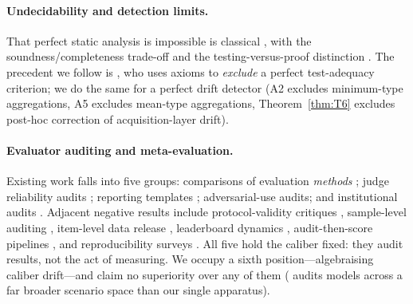\documentclass{article}
\begin{document}
\paragraph{Undecidability and detection limits.} That perfect static analysis is impossible is classical
\citep{turing1936computable,rice1953classes,landi1992undecidability,ramalingam1994undecidability}, with the
soundness/completeness trade-off \citep{cousot1977abstract} and the testing-versus-proof distinction
\citep{demillo1979social}. The precedent we follow is \citet{weyuker1988evaluation}, who uses axioms to
\emph{exclude} a perfect test-adequacy criterion; we do the same for a perfect drift detector (A2 excludes
minimum-type aggregations, A5 excludes mean-type aggregations, Theorem~\ref{thm:T6} excludes post-hoc
correction of acquisition-layer drift).

\paragraph{Evaluator auditing and meta-evaluation.} Existing work falls into five groups: comparisons of
evaluation \emph{methods} \citep{li2025meta,lv2026whoevaluates}; judge reliability audits
\citep{gu2024survey,tan2024judgebench,lambert2024rewardbench,zheng2023judging,norman2026reliabilityvalidity};
reporting templates \citep{mitchell2019modelcards,gebru2021datasheets}; adversarial-use audits; and
institutional audits \citep{costanzachock2022whoaudits,wang2026whoaudits,zhang2026whogrades}. Adjacent
negative results include protocol-validity critiques \citep{shao2026protocolvalidity}, sample-level auditing
\citep{siedler2026samplelevel}, item-level data release \citep{jiang2026itemlevel}, leaderboard dynamics
\citep{shankar2025leaderboard}, audit-then-score pipelines \citep{huang2026deepfact}, and reproducibility
surveys
\citep{siddiq2025reproducibilitycrisis,antunes2024reproducibilitysurvey,pineau2021improving,eve2026validationcrisis}.
All five hold the caliber fixed: they audit results, not the act of measuring. We occupy a sixth
position---algebraising caliber drift---and claim no superiority over any of them
(\citealp{liang2023helm} audits models across a far broader scenario space than our single apparatus).
\end{document}

